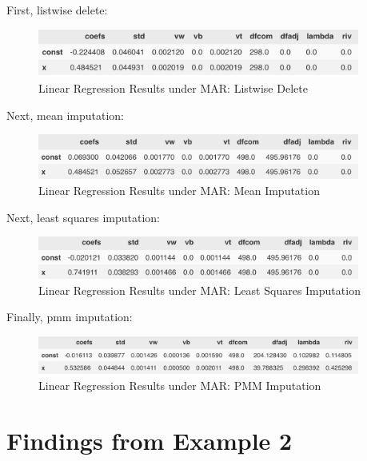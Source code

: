 \documentclass[12pt,oneside]{chicagocapstone}
\begin{document}
First, listwise delete:
\begin{figure}

{\centering \includegraphics[width=400px]{figure/mar-listwise-delete} 

}

\caption{Linear Regression Results under MAR: Listwise Delete}\label{fig:mar-listwise-delete}
\end{figure}
Next, mean imputation:
\begin{figure}

{\centering \includegraphics[width=400px]{figure/mar-mean} 

}

\caption{Linear Regression Results under MAR: Mean Imputation}\label{fig:mar-mean}
\end{figure}
Next, least squares imputation:
\begin{figure}

{\centering \includegraphics[width=400px]{figure/mar-ls} 

}

\caption{Linear Regression Results under MAR: Least Squares Imputation}\label{fig:mar-ls}
\end{figure}
Finally, pmm imputation:
\begin{figure}

{\centering \includegraphics[width=400px]{figure/mar-pmm} 

}

\caption{Linear Regression Results under MAR: PMM Imputation}\label{fig:mar-pmm}
\end{figure}
\section*{Findings from Example 2}\label{findings-from-example-2}
\end{document}
